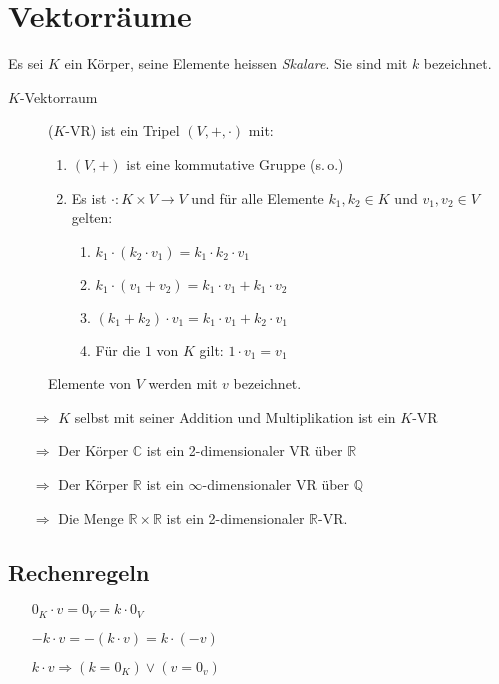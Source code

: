 \section{Vektorräume}
Es sei $K$ ein Körper, seine Elemente heissen \textit{Skalare}. Sie sind mit $k$ bezeichnet.

\begin{description}
	\item [$K$-Vektorraum] ($K$-VR) ist ein Tripel $(V, +, \cdot)$ mit:
	\begin{enumerate}\itemsep0em
		\item $(V, +)$ ist eine kommutative Gruppe (s.\,o.)
		\item Es ist $\cdot : K \times V \rightarrow V$ und für alle Elemente $k_1, k_2 \in K$ und $v_1, v_2 \in V$ gelten:
		\begin{enumerate}\itemsep0em
			\item $k_1 \cdot (k_2 \cdot v_1) = k_1\cdot k_2 \cdot v_1$
			\item $k_1 \cdot (v_1 + v_2) = k_1 \cdot v_1 + k_1 \cdot v_2$
			\item $(k_1 + k_2) \cdot v_1 = k_1 \cdot v_1 + k_2 \cdot v_1$
			\item Für die $1$ von $K$ gilt: $1 \cdot v_1 = v_1$
		\end{enumerate}
	\end{enumerate}
	Elemente von $V$ werden mit $v$ bezeichnet.
\end{description}
\begin{itemize}\itemsep0em
	\item [$\Rightarrow$] $K$ selbst mit seiner Addition und Multiplikation ist ein $K$-VR
	\item [$\Rightarrow$] Der Körper $\mathbb{C}$ ist ein 2-dimensionaler VR über $\mathbb{R}$
	\item [$\Rightarrow$] Der Körper $\mathbb{R}$ ist ein $\infty$-dimensionaler VR über $\mathbb{Q}$
	\item [$\Rightarrow$] Die Menge $\mathbb{R} \times \mathbb{R}$ ist ein 2-dimensionaler $\mathbb{R}$-VR.
\end{itemize}

\subsection{Rechenregeln}
\begin{itemize}\itemsep0em
	\item[] $0_K \cdot v = 0_V = k \cdot 0_V$
	\item[] $-k \cdot v = -(k \cdot v) = k \cdot (-v)$
	\item[] $k \cdot v \Rightarrow (k = 0_K) \vee (v = 0_v)$
\end{itemize}


